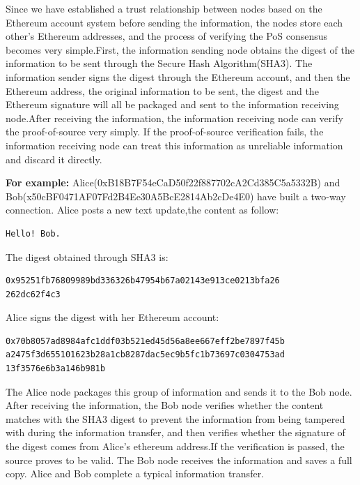 \documentclass{article}
\begin{document}
    Since we have established a trust relationship between nodes based on the Ethereum account system before sending the information, the nodes store each other's Ethereum addresses, and the process of verifying the PoS consensus becomes very simple.First, the information sending node obtains the digest of the information to be sent through the Secure Hash Algorithm(SHA3). The information sender signs the digest through the Ethereum account, and then the Ethereum address, the original information to be sent, the digest and the Ethereum signature will all be packaged and  sent to the information receiving node.After receiving the information, the information receiving node can verify the proof-of-source very simply. If the proof-of-source verification fails, the information receiving node can treat this information as unreliable information and discard it directly.
    ~\newline
    \begin{blockqt}
    \textbf{For example: }Alice(0xB18B7F54eCaD50f22f887702cA2Cd385C5a5332B) and Bob(x50cBF0471AF07Fd2B4Ee30A5BcE2814Ab2cDe4E0) have built a two-way connection. Alice posts a new text update,the content as follow: 
    
    \begin{lstlisting}[caption=Message from Alice, numbers=none]
Hello! Bob.
    \end{lstlisting}
    The digest obtained through SHA3 is:
    \begin{lstlisting}[caption=SHA3 digest of message, numbers=none, breaklines=true]
0x95251fb76809989bd336326b47954b67a02143e913ce0213bfa26
262dc62f4c3
    \end{lstlisting}
    Alice signs the digest with her Ethereum account:
    \begin{lstlisting}[caption=Signature, numbers=none]
0x70b8057ad8984afc1ddf03b521ed45d56a8ee667eff2be7897f45b
a2475f3d655101623b28a1cb8287dac5ec9b5fc1b73697c0304753ad
13f3576e6b3a146b981b
    \end{lstlisting}
    The Alice  node packages this group of information and sends it to the Bob node. After receiving the information, the Bob node verifies whether the content matches with the SHA3 digest to prevent the information from being tampered with during the information transfer, and then verifies whether the signature of the digest comes from Alice's ethereum address.If the verification is passed, the source proves to be valid. The Bob node receives the information and saves a full copy. Alice and Bob complete a typical information transfer.
    \end{blockqt}
\end{document}
